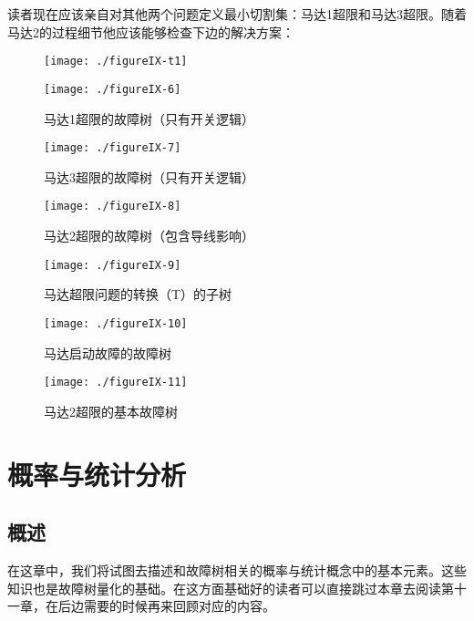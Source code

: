 \documentclass[cn,11pt,chinese]{elegantbook}
\begin{document}
{读者现在应该亲自对其他两个问题定义最小切割集：马达1超限和马达3超限。随着马达2的过程细节他应该能够检查下边的解决方案：

\begin{figure}[H]
	\centering
	\texttt{[image: ./figureIX-t1]}
\end{figure}

\begin{figure}[H]
	\centering
	\texttt{[image: ./figureIX-6]}
	\caption{马达1超限的故障树（只有开关逻辑）}\label{fig9-6}
\end{figure}

\begin{figure}[H]
	\centering
	\texttt{[image: ./figureIX-7]}
	\caption{马达3超限的故障树（只有开关逻辑）}\label{fig9-7}
\end{figure}

\begin{figure}[H]
	\centering
	\texttt{[image: ./figureIX-8]}
	\caption{马达2超限的故障树（包含导线影响）}\label{fig9-8}
\end{figure}

\begin{figure}[H]
	\centering
	\texttt{[image: ./figureIX-9]}
	\caption{马达超限问题的转换（T）的子树}\label{fig9-9}
\end{figure}

\begin{figure}[H]
	\centering
	\texttt{[image: ./figureIX-10]}
	\caption{马达启动故障的故障树}\label{fig9-10}
\end{figure}

\begin{figure}[H]
	\centering
	\texttt{[image: ./figureIX-11]}
	\caption{马达2超限的基本故障树}\label{fig9-11}
\end{figure}


\chapter{概率与统计分析}
\section{概述}

在这章中，我们将试图去描述和故障树相关的概率与统计概念中的基本元素。这些知识也是故障树量化的基础。在这方面基础好的读者可以直接跳过本章去阅读第十一章，在后边需要的时候再来回顾对应的内容。

}
\end{document}
